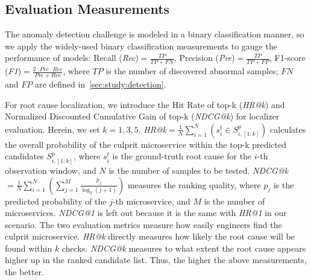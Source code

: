 \subsection{Evaluation Measurements}
The anomaly detection challenge is modeled in a binary classification manner, so we apply the widely-used binary classification measurements to gauge the performance of models:
Recall (\textit{Rec})$=\frac{TP}{TP+FN}$, Precision (\textit{Pre})$=\frac{TP}{TP+FP}$, F1-score (\textit{F1})$=\frac{2 \cdot Pre \cdot Rec}{Pre+Rec}$,
where $TP$ is the number of discovered abnormal samples; $FN$ and $FP$ are defined in~\cref{sec:study:detection}.

For root cause localization, we introduce the Hit Rate of top-k (\textit{HR@k}) and Normalized Discounted Cumulative Gain of top-k (\textit{NDCG@k}) for localizer evaluation. Herein, we set $k=1,3,5$.
\textit{HR@k}$=\frac{1}{N} \sum_{i=1}^N(s_i^t \in S^{p}_{i, [1:k]})$ calculates the overall probability of the culprit microservice within the top-k predicted candidates $S^{p}_{i, [1:k]}$, where $s_i^t$ is the ground-truth root cause for the $i$-th observation window, and $N$ is the number of samples to be tested. 
\textit{NDCG@k}$=\frac{1}{N} \sum_{i=1}^N (\sum_{j=1}^M \frac{p_j}{\log_2(j+1)})$ measures the ranking quality, where $p_j$ is the predicted probability of the $j$-th microservice, and $M$ is the number of microservices. 
\textit{NDCG@1} is left out because it is the same with \textit{HR@1} in our scenario.
The two evaluation metrics measure how easily engineers find the culprit microservice. \textit{HR@k} directly measures how likely the root cause will be found within $k$ checks. \textit{NDCG@k} measures to what extent the root cause appears higher up in the ranked candidate list.
Thus, the higher the above measurements, the better. 


